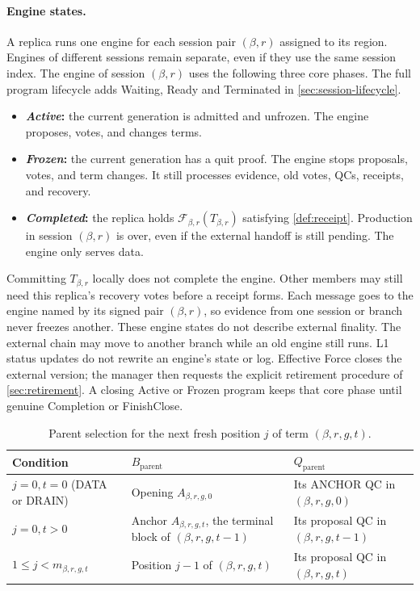 \documentclass[11pt,a4paper]{article}
\newcommand{\FC}{\mathcal F}
\newcommand{\defterm}[1]{\textcolor{rrBlue}{\textit{#1}}}
\begin{document}
\paragraph{Engine states.}
A replica runs one engine for each session pair $(\beta,r)$ assigned to its region.
Engines of different sessions remain separate, even if they use the
same session index. The engine of
session $(\beta,r)$ uses the following three core phases. The full
program lifecycle adds Waiting, Ready and Terminated in
\cref{sec:session-lifecycle}.
\begin{itemize}
\item \textbf{\defterm{Active}:} the current generation is admitted and unfrozen.
The engine proposes, votes, and changes terms.
\item \textbf{\defterm{Frozen}:} the current generation has a quit proof. The
engine stops proposals, votes, and term changes. It still processes
evidence, old votes, QCs, receipts, and recovery.
\item \textbf{\defterm{Completed}:} the replica holds $\FC_{\beta,r}(T_{\beta,r})$ satisfying
\cref{def:receipt}.
Production in session $(\beta,r)$ is over, even if the external handoff is still
pending. The engine only serves data.
\end{itemize}
Committing $T_{\beta,r}$ locally does not complete the engine. Other members may
still need this replica's recovery votes before a receipt forms. Each
message goes to the engine named by its signed pair $(\beta,r)$, so
evidence from one session or branch never freezes another. These engine
states do not describe external finality. The external chain may move
to another branch while an old engine still runs. L1 status
updates do not rewrite an engine's state or log. Effective Force closes
the external version; the manager then requests the explicit retirement
procedure of \cref{sec:retirement}. A closing Active or Frozen program
keeps that core phase until genuine Completion or FinishClose.

\begin{table}[htbp]\centering\small
\caption{Parent selection for the next fresh position $j$ of term $(\beta,r,g,t)$.}
\label{tab:parent}
\begin{tabularx}{\linewidth}{@{}l Y Y@{}}
\toprule
Condition & $B_{\mathrm{parent}}$ & $Q_{\mathrm{parent}}$\\
\midrule
$j=0,t=0$ (DATA or DRAIN) & Opening $A_{\beta,r,g,0}$ & Its ANCHOR QC in $(\beta,r,g,0)$\\
$j=0,t>0$ & Anchor $A_{\beta,r,g,t}$, the terminal block of $(\beta,r,g,t-1)$ & Its proposal QC in $(\beta,r,g,t-1)$\\
$1\le j<m_{\beta,r,g,t}$ & Position $j-1$ of $(\beta,r,g,t)$ & Its proposal QC in $(\beta,r,g,t)$\\
\bottomrule
\end{tabularx}
\end{table}
\end{document}
